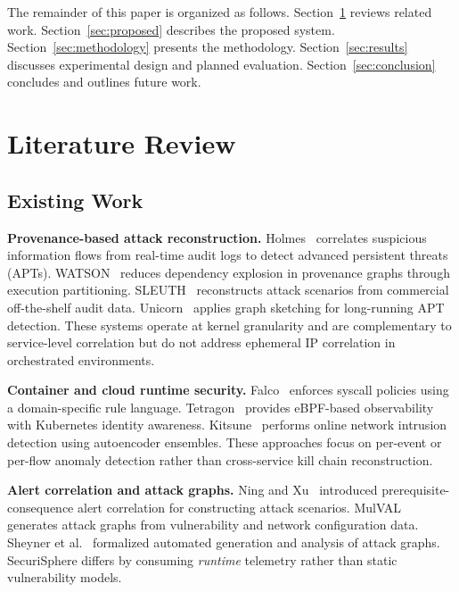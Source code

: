 \documentclass[conference]{IEEEtran}
\begin{document}
The remainder of this paper is organized as follows.
Section~\ref{sec:litreview} reviews related work.
Section~\ref{sec:proposed} describes the proposed system.
Section~\ref{sec:methodology} presents the methodology.
Section~\ref{sec:results} discusses experimental design and planned
evaluation.
Section~\ref{sec:conclusion} concludes and outlines future work.

\section{Literature Review}
\label{sec:litreview}

\subsection{Existing Work}
\textbf{Provenance-based attack reconstruction.}
Holmes~\cite{holmes2019} correlates suspicious information flows from
real-time audit logs to detect advanced persistent threats (APTs).
WATSON~\cite{watson2021} reduces dependency explosion in provenance graphs
through execution partitioning. SLEUTH~\cite{sleuth2017} reconstructs
attack scenarios from commercial off-the-shelf audit data. Unicorn~\cite{unicorn2020}
applies graph sketching for long-running APT detection. These systems
operate at kernel granularity and are complementary to service-level
correlation but do not address ephemeral IP correlation in orchestrated
environments.

\textbf{Container and cloud runtime security.}
Falco~\cite{falco2019} enforces syscall policies using a domain-specific
rule language. Tetragon~\cite{tetragon2022} provides eBPF-based observability
with Kubernetes identity awareness. Kitsune~\cite{kitsune2018} performs
online network intrusion detection using autoencoder ensembles. These
approaches focus on per-event or per-flow anomaly detection rather than
cross-service kill chain reconstruction.

\textbf{Alert correlation and attack graphs.}
Ning and Xu~\cite{ning2002} introduced prerequisite-consequence alert
correlation for constructing attack scenarios. MulVAL~\cite{mulval2006}
generates attack graphs from vulnerability and network configuration data.
Sheyner et al.~\cite{sheyner2002} formalized automated generation and
analysis of attack graphs. SecuriSphere differs by consuming \emph{runtime}
telemetry rather than static vulnerability models.
\end{document}
